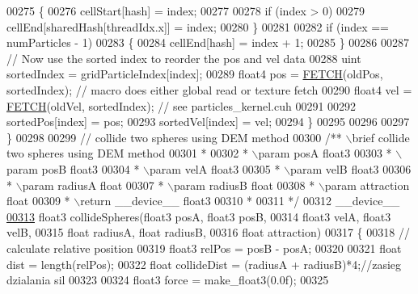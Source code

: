 \begin{DoxyCode}
00275         \{
00276             cellStart[hash] = index;
00277 
00278             \textcolor{keywordflow}{if} (index > 0)
00279                 cellEnd[sharedHash[threadIdx.x]] = index;
00280         \}
00281 
00282         \textcolor{keywordflow}{if} (index == numParticles - 1)
00283         \{
00284             cellEnd[hash] = index + 1;
00285         \}
00286 
00287         \textcolor{comment}{// Now use the sorted index to reorder the pos and vel data}
00288         uint sortedIndex = gridParticleIndex[index];
00289         float4 pos = \hyperlink{particles__kernel_8cuh_a12269d678a65f18889c2a7e98c756457}{FETCH}(oldPos, sortedIndex);       \textcolor{comment}{// macro does either global read or
       texture fetch}
00290         float4 vel = \hyperlink{particles__kernel_8cuh_a12269d678a65f18889c2a7e98c756457}{FETCH}(oldVel, sortedIndex);       \textcolor{comment}{// see particles\_kernel.cuh}
00291 
00292         sortedPos[index] = pos;
00293         sortedVel[index] = vel;
00294     \}
00295 
00296 
00297 \}
00298 
00299 \textcolor{comment}{// collide two spheres using DEM method}
00300 \textcolor{comment}{/** \(\backslash\)brief collide two spheres using DEM method}
00301 \textcolor{comment}{ *}
00302 \textcolor{comment}{ * \(\backslash\)param posA float3}
00303 \textcolor{comment}{ * \(\backslash\)param posB float3}
00304 \textcolor{comment}{ * \(\backslash\)param velA float3}
00305 \textcolor{comment}{ * \(\backslash\)param velB float3}
00306 \textcolor{comment}{ * \(\backslash\)param radiusA float}
00307 \textcolor{comment}{ * \(\backslash\)param radiusB float}
00308 \textcolor{comment}{ * \(\backslash\)param attraction float}
00309 \textcolor{comment}{ * \(\backslash\)return \_\_device\_\_ float3}
00310 \textcolor{comment}{ *}
00311 \textcolor{comment}{ */}
00312 \_\_device\_\_
\hypertarget{particles__kernel__impl_8cuh_source_l00313}{}\hyperlink{particles__kernel__impl_8cuh_a1d93cb067b16b4a472e9c1a08d9d8e68}{00313} float3 collideSpheres(float3 posA, float3 posB,
00314                       float3 velA, float3 velB,
00315                       \textcolor{keywordtype}{float} radiusA, \textcolor{keywordtype}{float} radiusB,
00316                       \textcolor{keywordtype}{float} attraction)
00317 \{
00318     \textcolor{comment}{// calculate relative position}
00319     float3 relPos = posB - posA;
00320 
00321     \textcolor{keywordtype}{float} dist = length(relPos);
00322     \textcolor{keywordtype}{float} collideDist = (radiusA + radiusB)*4;\textcolor{comment}{//zasieg dzialania sil}
00323 
00324     float3 force = make\_float3(0.0f);
00325 

\end{DoxyCode}
